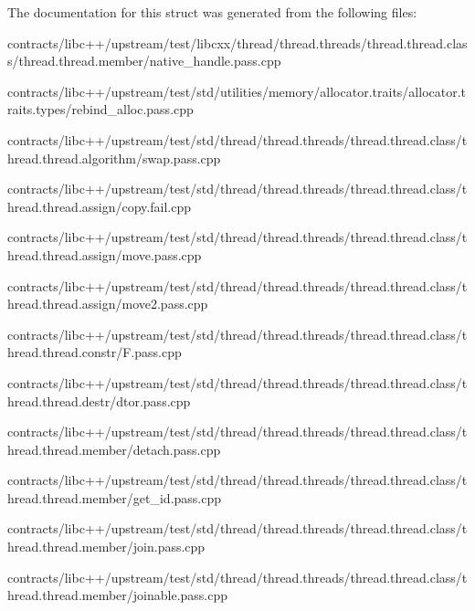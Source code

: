 The documentation for this struct was generated from the following files\+:\begin{DoxyCompactItemize}
\item 
contracts/libc++/upstream/test/libcxx/thread/thread.\+threads/thread.\+thread.\+class/thread.\+thread.\+member/native\+\_\+handle.\+pass.\+cpp\item 
contracts/libc++/upstream/test/std/utilities/memory/allocator.\+traits/allocator.\+traits.\+types/rebind\+\_\+alloc.\+pass.\+cpp\item 
contracts/libc++/upstream/test/std/thread/thread.\+threads/thread.\+thread.\+class/thread.\+thread.\+algorithm/swap.\+pass.\+cpp\item 
contracts/libc++/upstream/test/std/thread/thread.\+threads/thread.\+thread.\+class/thread.\+thread.\+assign/copy.\+fail.\+cpp\item 
contracts/libc++/upstream/test/std/thread/thread.\+threads/thread.\+thread.\+class/thread.\+thread.\+assign/move.\+pass.\+cpp\item 
contracts/libc++/upstream/test/std/thread/thread.\+threads/thread.\+thread.\+class/thread.\+thread.\+assign/move2.\+pass.\+cpp\item 
contracts/libc++/upstream/test/std/thread/thread.\+threads/thread.\+thread.\+class/thread.\+thread.\+constr/F.\+pass.\+cpp\item 
contracts/libc++/upstream/test/std/thread/thread.\+threads/thread.\+thread.\+class/thread.\+thread.\+destr/dtor.\+pass.\+cpp\item 
contracts/libc++/upstream/test/std/thread/thread.\+threads/thread.\+thread.\+class/thread.\+thread.\+member/detach.\+pass.\+cpp\item 
contracts/libc++/upstream/test/std/thread/thread.\+threads/thread.\+thread.\+class/thread.\+thread.\+member/get\+\_\+id.\+pass.\+cpp\item 
contracts/libc++/upstream/test/std/thread/thread.\+threads/thread.\+thread.\+class/thread.\+thread.\+member/join.\+pass.\+cpp\item 
contracts/libc++/upstream/test/std/thread/thread.\+threads/thread.\+thread.\+class/thread.\+thread.\+member/joinable.\+pass.\+cpp\end{DoxyCompactItemize}
